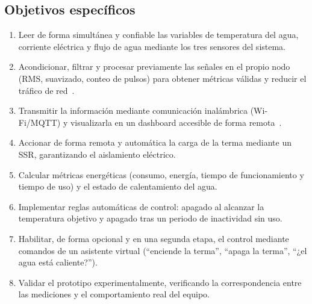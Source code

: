 \documentclass[11pt,a4paper]{article}
\begin{document}
\subsection*{Objetivos específicos}
\begin{enumerate}[label=OE\arabic*.]
  \item Leer de forma simultánea y confiable las variables de temperatura del agua, corriente eléctrica y flujo de agua mediante los tres sensores del sistema.
  \item Acondicionar, filtrar y procesar previamente las señales en el propio nodo (RMS, suavizado, conteo de pulsos) para obtener métricas válidas y reducir el tráfico de red~\cite{shi2016}.
  \item Transmitir la información mediante comunicación inalámbrica (Wi-Fi/MQTT) y visualizarla en un dashboard accesible de forma remota~\cite{alfuqaha2015,elkhozondar2024}.
  \item Accionar de forma remota y automática la carga de la terma mediante un SSR, garantizando el aislamiento eléctrico.
  \item Calcular métricas energéticas (consumo, energía, tiempo de funcionamiento y tiempo de uso) y el estado de calentamiento del agua.
  \item Implementar reglas automáticas de control: apagado al alcanzar la temperatura objetivo y apagado tras un periodo de inactividad sin uso.
  \item Habilitar, de forma opcional y en una segunda etapa, el control mediante comandos de un asistente virtual (``enciende la terma'', ``apaga la terma'', ``¿el agua está caliente?'').
  \item Validar el prototipo experimentalmente, verificando la correspondencia entre las mediciones y el comportamiento real del equipo.
\end{enumerate}
\end{document}
